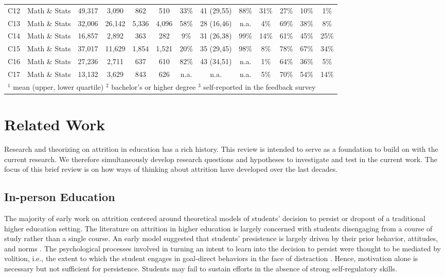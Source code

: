 \documentclass{sigchi}\usepackage[]{graphicx}\usepackage[]{color}
\begin{document}
\begin{table}[th]
\begin{tabular}{llccccccccccc}
C12 & Math \& Stats & 49,317 & 3,090 & 862   & 510      & 33\%   & 41 (29,55) & 88\%       & 31\% & 27\% & 10\% & 1\% \\
C13 & Math \& Stats & 32,006 & 26,142 & 5,336 & 4,096   & 58\%   & 28 (16,46) & n.a.       & 4\%  & 69\% & 38\% & 8\% \\
C14 & Math \& Stats & 16,857 & 2,892 & 363   & 282      & 9\%    & 31 (26,38) & 99\%       & 14\% & 61\% & 45\% & 25\% \\
C15 & Math \& Stats & 37,017 & 11,629 & 1,854 & 1,521   & 20\%   & 35 (29,45) & 98\%       & 8\%  & 78\% & 67\% & 34\% \\
C16 & Math \& Stats & 27,236 & 2,711 & 637   & 610      & 82\%   & 43 (34,51) & n.a.       & 1\%  & 64\% & 36\% & 5\% \\
C17 & Math \& Stats & 13,132 & 3,629 & 843   & 626      & n.a.   & n.a.       & n.a.       & 5\%  & 70\% & 54\% & 14\% \\
\bottomrule
\multicolumn{13}{l}{$^1$ mean (upper, lower quartile)  $^2$ bachelor's or higher degree  $^3$ self-reported in the feedback survey}
\end{tabular}
\end{table}


\section{Related Work}

Research and theorizing on attrition in education has a rich history. This review is intended to serve as a foundation to build on with the current research. We therefore simultaneously develop research questions and hypotheses to investigate and test in the current work. The focus of this brief review is on how ways of thinking about attrition have developed over the last decades. 

\subsection{In-person Education}

The majority of early work on attrition centered around theoretical models of students' decision to persist or dropout of a traditional higher education setting. The literature on attrition in higher education is largely concerned with students disengaging from a course of study rather than a single course. An early model suggested that students' presistence is largely driven by their prior behavior, attitudes, and norms \cite{fishbein1975belief}. The psychological processes involved in turning an intent to learn into the decision to persist were thought to be mediated by volition, i.e., the extent to which the student engages in goal-direct behaviors in the face of distraction \cite{corno1993role}. Hence, motivation alone is necessary but not sufficient for persistence. Students may fail to sustain efforts in the absence of strong self-regulatory skills.
\end{document}
